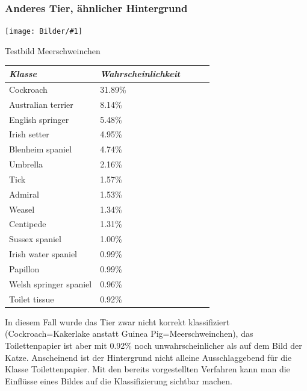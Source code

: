 \documentclass[
  12pt, %
  a4paper, %
  oneside, %
  openany, 
  numbers=noenddot, %
  BCOR=5mm, %
  parskip=half*, %
  thesis, %
]{bfhbook}
\newcommand{\imgText}[3]{
\begin{center}
    \begin{minipage}[t]{0.6\textwidth}
    		\vspace{0pt}
		\texttt{[image: Bilder/\#1]}
		\caption{#2}
	\end{minipage}\hfill
    \begin{minipage}[t]{0.4\textwidth}
    		\vspace{0pt}
  		#3
    \end{minipage}
\end{center}
}
\begin{document}
\subsubsection*{Anderes Tier, ähnlicher Hintergrund}
\imgText{IMG_2729.JPG}{Testbild Meerschweinchen}{

		\begin{tabular}{@{} *5l @{}}    \toprule
		\emph{Klasse} & \emph{Wahrscheinlichkeit} &&&  \\\midrule
		Cockroach & 31.89\% \\
		Australian terrier &  8.14\% \\
		English springer & 5.48\% \\
		Irish setter & 4.95\% \\
		Blenheim spaniel & 4.74\% \\
		Umbrella & 2.16\% \\
		Tick & 1.57\% \\
		Admiral & 1.53\% \\
		Weasel  & 1.34\% \\
		Centipede & 1.31\% \\
		Sussex spaniel & 1.00\% \\
		Irish water spaniel  & 0.99\% \\
		Papillon & 0.99\% \\
		Welsh springer spaniel  & 0.96\% \\
		Toilet tissue & 0.92\% \\ \bottomrule
		 \hline
		\end{tabular}
}
In diesem Fall wurde das Tier zwar nicht korrekt klassifiziert (Cockroach=Kakerlake anstatt Guinea Pig=Meerschweinchen), das Toilettenpapier ist aber mit 0.92\% noch unwahrscheinlicher als auf dem Bild der Katze. Anscheinend ist der Hintergrund nicht alleine Ausschlaggebend für die Klasse Toilettenpapier. Mit den bereits vorgestellten Verfahren kann man die Einflüsse eines Bildes auf die Klassifizierung sichtbar machen.
\end{document}
